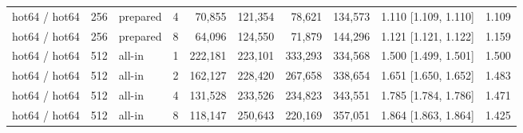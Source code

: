 \begin{table}[t]
{\begin{tabular}{lrlrrrrrlr}
hot64 / hot64 & 256 & prepared & 4 & 70{,}855 & 121{,}354 & 78{,}621 & 134{,}573 & 1.110 [1.109, 1.110] & 1.109 \\
hot64 / hot64 & 256 & prepared & 8 & 64{,}096 & 124{,}550 & 71{,}879 & 144{,}296 & 1.121 [1.121, 1.122] & 1.159 \\
hot64 / hot64 & 512 & all-in & 1 & 222{,}181 & 223{,}101 & 333{,}293 & 334{,}568 & 1.500 [1.499, 1.501] & 1.500 \\
hot64 / hot64 & 512 & all-in & 2 & 162{,}127 & 228{,}420 & 267{,}658 & 338{,}654 & 1.651 [1.650, 1.652] & 1.483 \\
hot64 / hot64 & 512 & all-in & 4 & 131{,}528 & 233{,}526 & 234{,}823 & 343{,}551 & 1.785 [1.784, 1.786] & 1.471 \\
hot64 / hot64 & 512 & all-in & 8 & 118{,}147 & 250{,}643 & 220{,}169 & 357{,}051 & 1.864 [1.863, 1.864] & 1.425 \\
\bottomrule
\end{tabular}}
\end{table}

